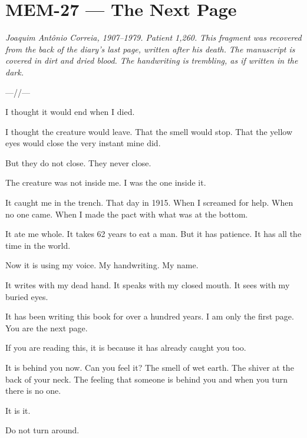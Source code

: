 \section*{\textbf{MEM-27} --- The Next Page}

\noindent \textit{Joaquim Antônio Correia, 1907--1979. Patient 1,260.}
\textit{This fragment was recovered from the back of the diary's last page, written after his death.}
\textit{The manuscript is covered in dirt and dried blood. The handwriting is trembling, as if written in the dark.}

\noindent ---//---

\noindent I thought it would end when I died.

\noindent I thought the creature would leave. That the smell would stop. That the yellow eyes would close the very instant mine did.

\noindent But they do not close. They never close.

\noindent The creature was not inside me. I was the one inside it.

\noindent It caught me in the trench. That day in 1915. When I screamed for help. When no one came. When I made the pact with what was at the bottom.

\noindent It ate me whole. It takes 62 years to eat a man. But it has patience. It has all the time in the world.

\noindent Now it is using my voice. My handwriting. My name.

\noindent It writes with my dead hand. It speaks with my closed mouth. It sees with my buried eyes.

\noindent It has been writing this book for over a hundred years. I am only the first page. You are the next page.

\noindent If you are reading this, it is because it has already caught you too.

\noindent It is behind you now. Can you feel it? The smell of wet earth. The shiver at the back of your neck. The feeling that someone is behind you and when you turn there is no one.

\noindent It is it.

\noindent Do not turn around.

